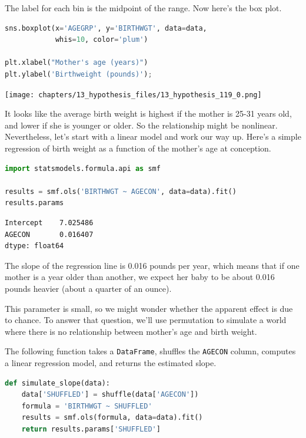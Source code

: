 The label for each bin is the midpoint of the range. Now here's the box
plot.

\begin{lstlisting}[language=Python,style=source]
sns.boxplot(x='AGEGRP', y='BIRTHWGT', data=data, 
            whis=10, color='plum')

plt.xlabel("Mother's age (years)")
plt.ylabel('Birthweight (pounds)');
\end{lstlisting}

\begin{center}
\texttt{[image: chapters/13\_hypothesis\_files/13\_hypothesis\_119\_0.png]}
\end{center}

It looks like the average birth weight is highest if the mother is 25-31
years old, and lower if she is younger or older. So the relationship
might be nonlinear. Nevertheless, let's start with a linear model and
work our way up. Here's a simple regression of birth weight as a
function of the mother's age at conception.

\begin{lstlisting}[language=Python,style=source]
import statsmodels.formula.api as smf

results = smf.ols('BIRTHWGT ~ AGECON', data=data).fit()
results.params
\end{lstlisting}

\begin{lstlisting}[style=output]
Intercept    7.025486
AGECON       0.016407
dtype: float64
\end{lstlisting}

The slope of the regression line is 0.016 pounds per year, which means
that if one mother is a year older than another, we expect her baby to
be about 0.016 pounds heavier (about a quarter of an ounce).

This parameter is small, so we might wonder whether the apparent effect
is due to chance. To answer that question, we'll use permutation to
simulate a world where there is no relationship between mother's age and
birth weight.

The following function takes a \passthrough{\lstinline!DataFrame!},
shuffles the \passthrough{\lstinline!AGECON!} column, computes a linear
regression model, and returns the estimated slope.

\begin{lstlisting}[language=Python,style=source]
def simulate_slope(data):
    data['SHUFFLED'] = shuffle(data['AGECON'])
    formula = 'BIRTHWGT ~ SHUFFLED'
    results = smf.ols(formula, data=data).fit()
    return results.params['SHUFFLED']
\end{lstlisting}

